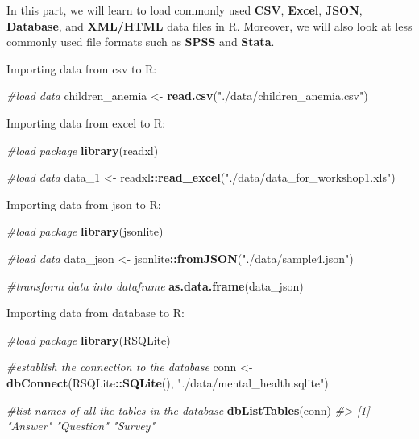 \documentclass[
]{book}
\newenvironment{Shaded}{\begin{snugshade}}{\end{snugshade}}
\newcommand{\CommentTok}[1]{\textcolor[rgb]{0.56,0.35,0.01}{\textit{#1}}}
\newcommand{\FunctionTok}[1]{\textcolor[rgb]{0.13,0.29,0.53}{\textbf{#1}}}
\newcommand{\NormalTok}[1]{#1}
\newcommand{\OtherTok}[1]{\textcolor[rgb]{0.56,0.35,0.01}{#1}}
\newcommand{\SpecialCharTok}[1]{\textcolor[rgb]{0.81,0.36,0.00}{\textbf{#1}}}
\newcommand{\StringTok}[1]{\textcolor[rgb]{0.31,0.60,0.02}{#1}}
\begin{document}
In this part, we will learn to load commonly used \textbf{CSV}, \textbf{Excel}, \textbf{JSON}, \textbf{Database}, and \textbf{XML/HTML} data files in R. Moreover, we will also look at less commonly used file formats such as \textbf{SPSS} and \textbf{Stata}.

Importing data from csv to R:

\begin{Shaded}
\begin{Highlighting}[]
\CommentTok{\#load data}
\NormalTok{children\_anemia }\OtherTok{\textless{}{-}} \FunctionTok{read.csv}\NormalTok{(}\StringTok{"./data/children\_anemia.csv"}\NormalTok{)}
\end{Highlighting}
\end{Shaded}

Importing data from excel to R:

\begin{Shaded}
\begin{Highlighting}[]
\CommentTok{\#load package}
\FunctionTok{library}\NormalTok{(readxl)}

\CommentTok{\#load data}
\NormalTok{data\_1 }\OtherTok{\textless{}{-}}\NormalTok{ readxl}\SpecialCharTok{::}\FunctionTok{read\_excel}\NormalTok{(}\StringTok{"./data/data\_for\_workshop1.xls"}\NormalTok{)}
\end{Highlighting}
\end{Shaded}

Importing data from json to R:

\begin{Shaded}
\begin{Highlighting}[]
\CommentTok{\#load package}
\FunctionTok{library}\NormalTok{(jsonlite)}

\CommentTok{\#load data}
\NormalTok{data\_json }\OtherTok{\textless{}{-}}\NormalTok{ jsonlite}\SpecialCharTok{::}\FunctionTok{fromJSON}\NormalTok{(}\StringTok{"./data/sample4.json"}\NormalTok{)}

\CommentTok{\#transform data into dataframe}
\FunctionTok{as.data.frame}\NormalTok{(data\_json)}
\end{Highlighting}
\end{Shaded}

Importing data from database to R:

\begin{Shaded}
\begin{Highlighting}[]
\CommentTok{\#load package}
\FunctionTok{library}\NormalTok{(RSQLite)}

\CommentTok{\#establish the connection to the database}
\NormalTok{conn }\OtherTok{\textless{}{-}} \FunctionTok{dbConnect}\NormalTok{(RSQLite}\SpecialCharTok{::}\FunctionTok{SQLite}\NormalTok{(), }\StringTok{"./data/mental\_health.sqlite"}\NormalTok{)}

\CommentTok{\#list names of all the tables in the database}
\FunctionTok{dbListTables}\NormalTok{(conn)}
\CommentTok{\#\textgreater{} [1] "Answer"   "Question" "Survey"}
\end{Highlighting}
\end{Shaded}
\end{document}
